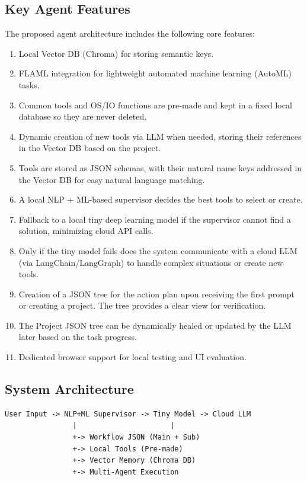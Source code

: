 \documentclass[12pt,a4paper]{article}
\begin{document}
\subsection{Key Agent Features}
The proposed agent architecture includes the following core features:
\begin{enumerate}
    \item Local Vector DB (Chroma) for storing semantic keys.
    \item FLAML integration for lightweight automated machine learning (AutoML) tasks.
    \item Common tools and OS/IO functions are pre-made and kept in a fixed local database so they are never deleted.
    \item Dynamic creation of new tools via LLM when needed, storing their references in the Vector DB based on the project.
    \item Tools are stored as JSON schemas, with their natural name keys addressed in the Vector DB for easy natural language matching.
    \item A local NLP + ML-based supervisor decides the best tools to select or create.
    \item Fallback to a local tiny deep learning model if the supervisor cannot find a solution, minimizing cloud API calls.
    \item Only if the tiny model fails does the system communicate with a cloud LLM (via LangChain/LangGraph) to handle complex situations or create new tools.
    \item Creation of a JSON tree for the action plan upon receiving the first prompt or creating a project. The tree provides a clear view for verification.
    \item The Project JSON tree can be dynamically healed or updated by the LLM later based on the task progress.
    \item Dedicated browser support for local testing and UI evaluation.
\end{enumerate}

\subsection{System Architecture}
\begin{verbatim}
User Input -> NLP+ML Supervisor -> Tiny Model -> Cloud LLM
                |                      |
                +-> Workflow JSON (Main + Sub)
                +-> Local Tools (Pre-made)
                +-> Vector Memory (Chroma DB)
                +-> Multi-Agent Execution
\end{verbatim}
\end{document}
